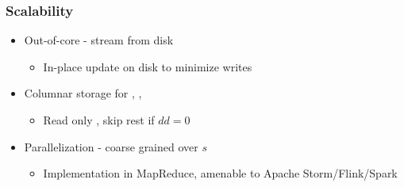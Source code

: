 \begin{frame}
  \frametitle{Scalability}

  \begin{itemize}
    \item Out-of-core - stream \spdag from disk
      \begin{itemize}
        \item In-place update on disk to minimize writes
      \end{itemize}
    \item Columnar storage for \dist, \paths, \dep
      \begin{itemize}
        \item Read only \dist, skip rest if $dd=0$
      \end{itemize}
    \item Parallelization - coarse grained over $s$
      \begin{itemize}
        \item Implementation in MapReduce, amenable to Apache Storm/Flink/Spark
      \end{itemize}
  \end{itemize}

\end{frame}


